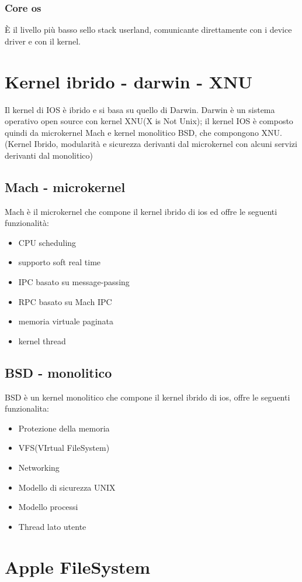 \documentclass{report}
\begin{document}
\subsubsection*{Core os}
È il livello più basso sello stack userland, comunicante direttamente con i device driver e con il kernel.
\section{Kernel ibrido - darwin - XNU}
Il kernel di IOS è ibrido e si basa su quello di Darwin. Darwin è un sistema operativo open source con kernel XNU(X is Not Unix); il kernel IOS è composto quindi da microkernel Mach e kernel monolitico BSD, che compongono XNU.
(Kernel Ibrido, modularità e sicurezza derivanti dal microkernel con alcuni servizi derivanti dal monolitico)
\subsection{Mach - microkernel}
Mach è il microkernel che compone il kernel ibrido di ios ed offre le seguenti funzionalità:
\begin{itemize}
    \item CPU scheduling
    \item supporto soft real time
    \item IPC basato su message-passing
    \item RPC basato su Mach IPC
    \item memoria virtuale paginata
    \item kernel thread
\end{itemize}
\subsection{BSD - monolitico}
BSD è un kernel monolitico che compone il kernel ibrido di ios, offre le seguenti funzionalita:
\begin{itemize}
    \item Protezione della memoria
    \item VFS(VIrtual FileSystem) 
    \item Networking
    \item Modello di sicurezza UNIX
    \item Modello processi
    \item Thread lato utente

\end{itemize}
\section{Apple FileSystem}
\end{document}
